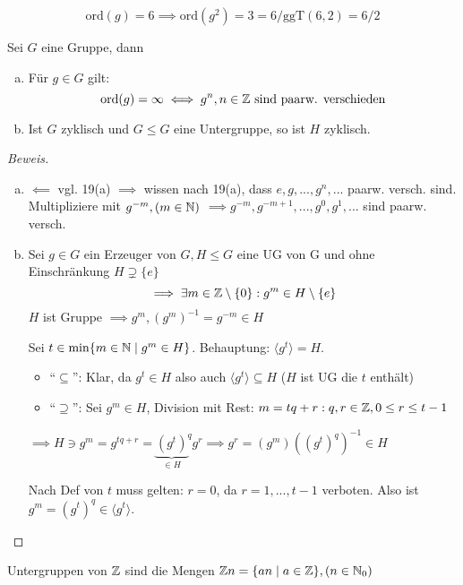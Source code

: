 \documentclass[a4paper]{report}
\begin{document}
\begin{bsp*}
$$\mathrm{ord}(g) = 6 \implies \mathrm{ord}(g^{2}) = 3 = 6/\mathrm{ggT}(6,2) = 6/2$$
\end{bsp*}

\begin{kor}
  Sei $G$ eine Gruppe, dann
  \begin{enumerate}[(a)]
    \item Für $g \in G$ gilt: $$\mathrm{ord}(g)= \infty \iff g^{n}, n \in \Bbb Z \text{ sind paarw. verschieden}$$
    \item Ist $G$ zyklisch und $G \le G$ eine Untergruppe, so ist $H$ zyklisch.
  \end{enumerate}
\begin{proof}[Beweis]
\item
  \begin{enumerate}[(a)]
\item $\impliedby$ vgl. 19(a)
$\implies$ wissen nach 19(a), dass $e, g, ..., g^{n}, ...$ paarw. versch. sind. Multipliziere mit $g^{-m},(m \in \Bbb N)$
$\implies g^{-m}, g^{-m+1}, ..., g^{0}, g^{1}, ...$ sind paarw. versch.
\item Sei $g \in G$ ein Erzeuger von $G, H \le G$ eine UG von G und ohne Einschränkung $H \supsetneq \{e\}$
$$\implies \exists m \in \Bbb Z \setminus \{0\}:g^{m} \in H \setminus \{e\}$$
$H$ ist Gruppe $\implies g^{m}, (g^{m})^{-1} = g^{-m} \in H$

Sei $t \in \min\{m \in \Bbb N \mid g^{m} \in H\}$. Behauptung: $\langle g^{t} \rangle = H$.
\begin{itemize}
\item ``$\subseteq$'': Klar, da $g^{t} \in H$ also auch $\langle g^{t} \rangle \subseteq H$ ($H$ ist UG die $t$ enthält)
\item ``$\supseteq$'': Sei $g^{m} \in H$, Division mit Rest: $m = tq + r:  q, r \in \Bbb Z, 0 \leq r \leq t-1$
\end{itemize}
$\implies H \ni g^{m} = g^{tq + r} = {\underbrace{(g^{t})}_{\in H}}^{q}g^{r} \implies g^{r} = (g^{m})((g^{t})^{q})^{-1} \in H$

          Nach Def von $t$ muss gelten: $r = 0$, da $r = 1, ..., t-1$ verboten.
Also ist $g^{m} = (g^{t})^{q} \in \langle g^{t} \rangle$.
  \end{enumerate}

\end{proof}


\end{kor}
\begin{kor}[Übung]
Untergruppen von $\Bbb Z$ sind die Mengen $\Bbb Zn = \{an \mid a \in \Bbb Z\}, (n \in \Bbb N_{0})$
\end{kor}
\end{document}
